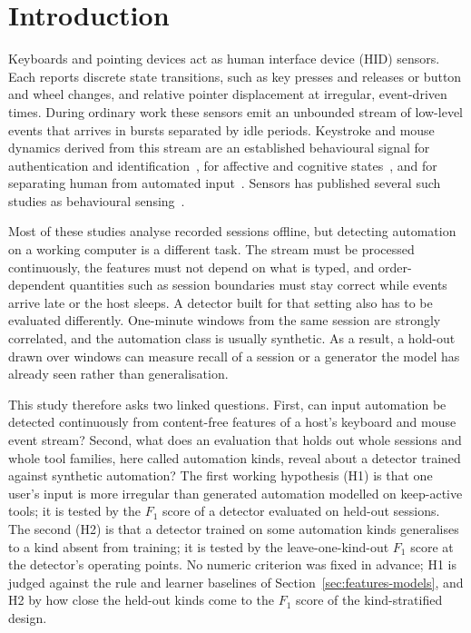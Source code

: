 \documentclass[sensors,article,submit,pdftex,oneauthor]{Definitions/mdpi}
\begin{document}
\section{Introduction}
\label{sec:intro}

Keyboards and pointing devices act as human interface device (HID) sensors. Each reports discrete state transitions, such as key presses and releases or button and wheel changes, and relative pointer displacement at irregular, event-driven times. During ordinary work these sensors emit an unbounded stream of low-level events that arrives in bursts separated by idle periods. Keystroke and mouse dynamics derived from this stream are an established behavioural signal for authentication and identification~\cite{monrose2000keystroke, teh2013survey, kasprowski2022keystroke, wycislik2024keystroke, lis2023siamese, subash2026adaptability}, for affective and cognitive states~\cite{epp2011identifying, kolakowska2021opinions, acien2022fatigue}, and for separating human from automated input~\cite{gianvecchio2009botcraft, acien2022becaptcha}. Sensors has published several such studies as behavioural sensing~\cite{wang2022siurua, kasprowski2022keystroke, wycislik2024keystroke, lis2023siamese}.

Most of these studies analyse recorded sessions offline, but detecting automation on a working computer is a different task. The stream must be processed continuously, the features must not depend on what is typed, and order-dependent quantities such as session boundaries must stay correct while events arrive late or the host sleeps. A detector built for that setting also has to be evaluated differently. One-minute windows from the same session are strongly correlated, and the automation class is usually synthetic. As a result, a hold-out drawn over windows can measure recall of a session or a generator the model has already seen rather than generalisation.

This study therefore asks two linked questions. First, can input automation be detected continuously from content-free features of a host's keyboard and mouse event stream? Second, what does an evaluation that holds out whole sessions and whole tool families, here called automation kinds, reveal about a detector trained against synthetic automation? The first working hypothesis (H1) is that one user's input is more irregular than generated automation modelled on keep-active tools; it is tested by the $F_1$ score of a detector evaluated on held-out sessions. The second (H2) is that a detector trained on some automation kinds generalises to a kind absent from training; it is tested by the leave-one-kind-out $F_1$ score at the detector's operating points. No numeric criterion was fixed in advance; H1 is judged against the rule and learner baselines of Section~\ref{sec:features-models}, and H2 by how close the held-out kinds come to the $F_1$ score of the kind-stratified design.
\end{document}
